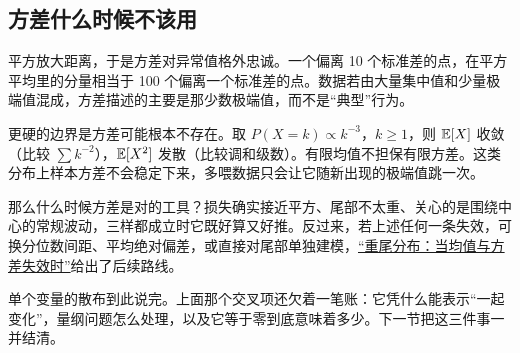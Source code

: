 \subsection{方差什么时候不该用}

平方放大距离，于是方差对异常值格外忠诚。一个偏离 10 个标准差的点，在平方平均里的分量相当于 100 个偏离一个标准差的点。数据若由大量集中值和少量极端值混成，方差描述的主要是那少数极端值，而不是``典型''行为。

更硬的边界是方差可能根本不存在。取 \(P(X=k)\propto k^{-3}\)，\(k\ge1\)，则 \(\mathbb{E}[X]\) 收敛（比较 \(\sum k^{-2}\)），\(\mathbb{E}[X^2]\) 发散（比较调和级数）。有限均值不担保有限方差。这类分布上样本方差不会稳定下来，多喂数据只会让它随新出现的极端值跳一次。

那么什么时候方差是对的工具？损失确实接近平方、尾部不太重、关心的是围绕中心的常规波动，三样都成立时它既好算又好推。反过来，若上述任何一条失效，可换分位数间距、平均绝对偏差，或直接对尾部单独建模，\hyperref[sec:05-Probability/06-Common-Distributions/07]{``重尾分布：当均值与方差失效时''}给出了后续路线。

单个变量的散布到此说完。上面那个交叉项还欠着一笔账：它凭什么能表示``一起变化''，量纲问题怎么处理，以及它等于零到底意味着多少。下一节把这三件事一并结清。
